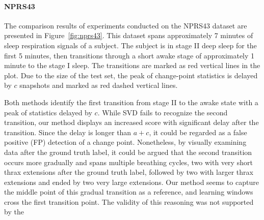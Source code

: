 \paragraph{NPRS43}
The comparison results of experiments conducted on the NPRS43 dataset are presented in Figure~\ref{fig:nprs43}. This dataset spans approximately 7 minutes of sleep respiration signals of a subject. The subject is in stage II deep sleep for the first 5 minutes, then transitions through a short awake stage of approximately 1 minute to the stage I sleep. The transitions are marked as red vertical lines in the plot. Due to the size of the test set, the peak of change-point statistics is delayed by \(c\) snapshots and marked as red dashed vertical lines.

Both methods identify the first transition from stage II to the awake state with a peak of statistics delayed by \(c\). While SVD fails to recognize the second transition, our method displays an increased score with significant delay after the transition. Since the delay is longer than \(a + c\), it could be regarded as a false positive (FP) detection of a change point. Nonetheless, by visually examining data after the ground truth label, it could be argued that the second transition occurs more gradually and spans multiple breathing cycles, two with very short thrax extensions after the ground truth label, followed by two with larger thrax extensions and ended by two very large extensions. Our method seems to capture the middle point of this gradual transition as a reference, and learning windows cross the first transition point. The validity of this reasoning was not supported by the

